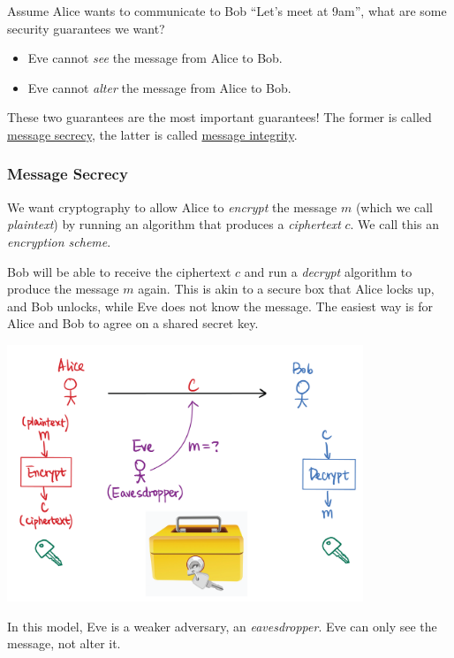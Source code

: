 Assume Alice wants to communicate to Bob ``Let's meet at 9am'', what are some security guarantees we want?

\begin{itemize}
    \item Eve cannot \emph{see} the message from Alice to Bob.
    \item Eve cannot \emph{alter} the message from Alice to Bob. 
\end{itemize}

These two guarantees are the most important guarantees! The former is called \ul{message secrecy}, the latter is called \ul{message integrity}.

\subsubsection{Message Secrecy}

\begin{definition}
    We want cryptography to allow Alice to \emph{encrypt} the message $m$ (which we call \emph{plaintext}) by running an algorithm that produces a \emph{ciphertext} $c$. We call this an \emph{encryption scheme}.

    Bob will be able to receive the ciphertext $c$ and run a \emph{decrypt} algorithm to produce the message $m$ again. This is akin to a secure box that Alice locks up, and Bob unlocks, while Eve does not know the message. The easiest way is for Alice and Bob to agree on a shared secret key.

    \begin{center}
        \includegraphics[width=0.8\textwidth]{images/2023-01-26/message_secrecy.png}
    \end{center}

    In this model, Eve is a weaker adversary, an \emph{eavesdropper}. Eve can only see the message, not alter it.
\end{definition}

